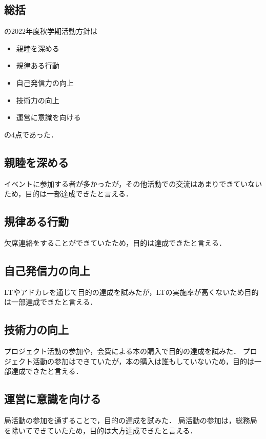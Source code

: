 \subsection*{\firstGrade{}総括}


\firstGrade{}の2022年度秋学期活動方針は
\begin{itemize}
    \item 親睦を深める
    \item 規律ある行動
    \item 自己発信力の向上
    \item 技術力の向上
    \item 運営に意識を向ける
\end{itemize}
の4点であった．

\subsection*{親睦を深める}
イベントに参加する者が多かったが，その他活動での交流はあまりできていないため，目的は一部達成できたと言える．

\subsection*{規律ある行動}
欠席連絡をすることができていたため，目的は達成できたと言える．

\subsection*{自己発信力の向上}
LTやアドカレを通じて目的の達成を試みたが，LTの実施率が高くないため目的は一部達成できたと言える．

\subsection*{技術力の向上}
プロジェクト活動の参加や，会費による本の購入で目的の達成を試みた．
プロジェクト活動の参加はできていたが，本の購入は誰もしていないため，目的は一部達成できたと言える．

\subsection*{運営に意識を向ける}
局活動の参加を通ずることで，目的の達成を試みた．
局活動の参加は，総務局を除いてできていたため，目的は大方達成できたと言える．

